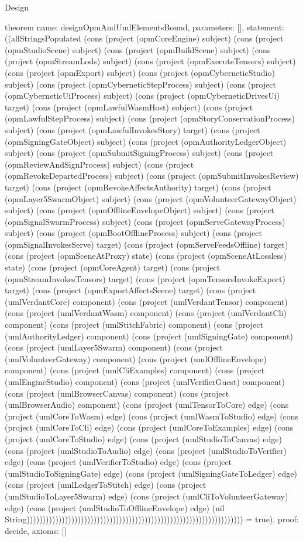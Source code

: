 \begin{lexlean}{Design}
\begin{semanticmodule}
theorem{
  name: designOpmAndUmlElementsBound,
  parameters: [],
  statement: ((allStringsPopulated (cons (project (opmCoreEngine) subject) (cons (project (opmStudioScene) subject) (cons (project (opmBuildScene) subject) (cons (project (opmStreamLods) subject) (cons (project (opmExecuteTensors) subject) (cons (project (opmExport) subject) (cons (project (opmCyberneticStudio) subject) (cons (project (opmCyberneticStepProcess) subject) (cons (project (opmCyberneticUiProcess) subject) (cons (project (opmCyberneticDrivesUi) target) (cons (project (opmLawfulWasmHost) subject) (cons (project (opmLawfulStepProcess) subject) (cons (project (opmStoryConservationProcess) subject) (cons (project (opmLawfulInvokesStory) target) (cons (project (opmSigningGateObject) subject) (cons (project (opmAuthorityLedgerObject) subject) (cons (project (opmSubmitSigningProcess) subject) (cons (project (opmReviewAndSignProcess) subject) (cons (project (opmRevokeDepartedProcess) subject) (cons (project (opmSubmitInvokesReview) target) (cons (project (opmRevokeAffectsAuthority) target) (cons (project (opmLayer5SwarmObject) subject) (cons (project (opmVolunteerGatewayObject) subject) (cons (project (opmOfflineEnvelopeObject) subject) (cons (project (opmSignalSwarmProcess) subject) (cons (project (opmServeGatewayProcess) subject) (cons (project (opmBootOfflineProcess) subject) (cons (project (opmSignalInvokesServe) target) (cons (project (opmServeFeedsOffline) target) (cons (project (opmSceneAtProxy) state) (cons (project (opmSceneAtLossless) state) (cons (project (opmCoreAgent) target) (cons (project (opmStreamInvokesTensors) target) (cons (project (opmTensorsInvokeExport) target) (cons (project (opmExportAffectsScene) target) (cons (project (umlVerdantCore) component) (cons (project (umlVerdantTensor) component) (cons (project (umlVerdantWasm) component) (cons (project (umlVerdantCli) component) (cons (project (umlStitchFabric) component) (cons (project (umlAuthorityLedger) component) (cons (project (umlSigningGate) component) (cons (project (umlLayer5Swarm) component) (cons (project (umlVolunteerGateway) component) (cons (project (umlOfflineEnvelope) component) (cons (project (umlCliExamples) component) (cons (project (umlEngineStudio) component) (cons (project (umlVerifierGuest) component) (cons (project (umlBrowserCanvas) component) (cons (project (umlBrowserAudio) component) (cons (project (umlTensorToCore) edge) (cons (project (umlCoreToWasm) edge) (cons (project (umlWasmToStudio) edge) (cons (project (umlCoreToCli) edge) (cons (project (umlCoreToExamples) edge) (cons (project (umlCoreToStudio) edge) (cons (project (umlStudioToCanvas) edge) (cons (project (umlStudioToAudio) edge) (cons (project (umlStudioToVerifier) edge) (cons (project (umlVerifierToStudio) edge) (cons (project (umlStudioToSigningGate) edge) (cons (project (umlSigningGateToLedger) edge) (cons (project (umlLedgerToStitch) edge) (cons (project (umlStudioToLayer5Swarm) edge) (cons (project (umlCliToVolunteerGateway) edge) (cons (project (umlStudioToOfflineEnvelope) edge) (nil String)))))))))))))))))))))))))))))))))))))))))))))))))))))))))))))))))))) = true),
  proof: decide{},
  axioms: []
}
\end{semanticmodule}
\end{lexlean}
